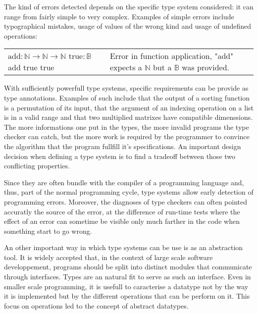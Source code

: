 The kind of errors detected depends on the specific type system considered: it can range from
fairly simple to very complex. Examples of simple errors include typographical mistakes, usage of
values of the wrong kind and usage of undefined operations:

\begin{center}
  \begin{tabular}{m{3.5cm} | m{5.5cm}}
    $\text{add} : \mathbb{N} \to \mathbb{N} \to \mathbb{N}$ \newline
    $\text{true} : \mathbb{B}$ \newline
    add true true
    & Error in function application, "add" expects a $\mathbb{N}$ but a $\mathbb{B}$ was provided.
  \end{tabular}
\end{center}

With sufficiently powerfull type systems, specific requirements can be provide as type annotations.
Examples of such include that the output of a sorting function is a permutation of its input, that
the argument of an indexing operation on a list is in a valid range and that two multiplied matrixes
have compatible dimenssions. The more informations one put in the types, the more invalid programs
the type checker can catch, but the more work is required by the programmer to convince the
algorithm that the program fullfill it's specifications. An important design decision when defining
a type system is to find a tradeoff between those two conflicting properties.

Since they are often bundle with the compiler of a programming language and, thus, part of the
normal programming cycle, type systems allow early detection of programming errors. Moreover, the
diagnoses of type checkers can often pointed accuratly the source of the error, at the difference of
run-time tests where the effect of an error can sometime be visible only much farther in the code
when something start to go wrong.

An other important way in which type systems can be use is as an abstraction tool. It is widely
accepted that, in the context of large scale software developpement, programs should be split into
distinct modules that communicate through interfaces. Types are an natural fit to serve as such an
interface. Even in smaller scale programming, it is usefull to caracterise a datatype not by the
way it is implemented but by the different operations that can be perform on it. This focus on
operations led to the concept of abstract datatypes.

